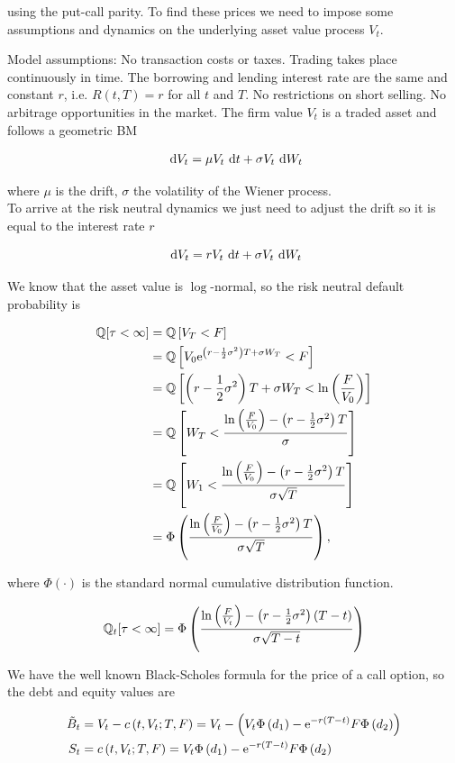 using the put-call parity. To find these prices we need to impose some assumptions and dynamics on the underlying asset value process $V_{t}$.

Model assumptions: No transaction costs or taxes. Trading takes place continuously in time. The borrowing and lending interest rate are the same and constant $r$, i.e. $R(t, T)=r$ for all $t$ and $T$. No restrictions on short selling. No arbitrage opportunities in the market. The firm value $V_{t}$ is a traded asset and follows a geometric BM

$$
\text{ d}  V_{t}=\mu V_{t} \text{ d}  t+\sigma V_{t} \text{ d}  W_{t}
$$

where $\mu$ is the drift, $\sigma$ the volatility of the Wiener process.\\
To arrive at the risk neutral dynamics we just need to adjust the drift so it is equal to the interest rate $r$

$$
\text{ d}  V_{t}=r V_{t} \text{ d}  t+\sigma V_{t} \text{ d}  W_{t}
$$

We know that the asset value is $\log$-normal, so the risk neutral default probability is

$$
\begin{aligned}
\mathbb{Q}[\tau<\infty] & =\mathbb{Q}\left[V_{T}<F\right] \\
& =\mathbb{Q}\left[V_{0} \mathrm{e}^{\left(r-\frac{1}{2} \sigma^{2}\right) T+\sigma W_{T}}<F\right] \\
& =\mathbb{Q}\left[\left(r-\frac{1}{2} \sigma^{2}\right) T+\sigma W_{T}<\ln \left(\frac{F}{V_{0}}\right)\right] \\
& =\mathbb{Q}\left[W_{T}<\frac{\ln \left(\frac{F}{V_{0}}\right)-\left(r-\frac{1}{2} \sigma^{2}\right) T}{\sigma}\right] \\
& =\mathbb{Q}\left[W_{1}<\frac{\ln \left(\frac{F}{V_{0}}\right)-\left(r-\frac{1}{2} \sigma^{2}\right) T}{\sigma \sqrt{T}}\right] \\
& =\Phi\left(\frac{\ln \left(\frac{F}{V_{0}}\right)-\left(r-\frac{1}{2} \sigma^{2}\right) T}{\sigma \sqrt{T}}\right),
\end{aligned}
$$

where $\Phi(\cdot)$ is the standard normal cumulative distribution function.

$$
\mathbb{Q}_{t}[\tau<\infty]=\Phi\left(\frac{\ln \left(\frac{F}{V_{t}}\right)-\left(r-\frac{1}{2} \sigma^{2}\right)(T-t)}{\sigma \sqrt{T-t}}\right)
$$

We have the well known Black-Scholes formula for the price of a call option, so the debt and equity values are

$$
\begin{aligned}
\tilde{B}_{t} & =V_{t}-c\left(t, V_{t} ; T, F\right)=V_{t}-\left(V_{t} \Phi\left(d_{1}\right)-\mathrm{e}^{-r(T-t)} F \Phi\left(d_{2}\right)\right) \\
S_{t} & =c\left(t, V_{t} ; T, F\right)=V_{t} \Phi\left(d_{1}\right)-\mathrm{e}^{-r(T-t)} F \Phi\left(d_{2}\right)
\end{aligned}
$$

